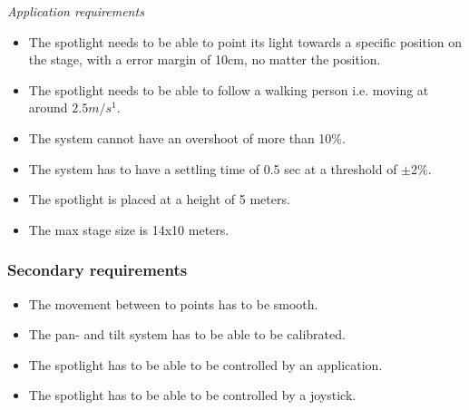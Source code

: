 \textit{Application requirements}

\begin{itemize}
\item The spotlight needs to be able to point its light towards a specific position on the stage, with a error margin of 10cm, no matter the position.

\item The spotlight needs to be able to follow a walking person i.e. moving at around $2.5 m/s^{1}$.

\item The system cannot have an overshoot of more than 10\%.

\item The system has to have a settling time of 0.5 sec at a threshold of $\pm$2\%.

\item The spotlight is placed at a height of 5 meters.

\item The max stage size is 14x10 meters.
\end{itemize}


\subsubsection{Secondary requirements}

\begin{itemize}
\item The movement between to points has to be smooth.

\item The pan- and tilt system has to be able to be calibrated.

\item The spotlight has to be able to be controlled by an application.

\item The spotlight has to be able to be controlled by a joystick.
\end{itemize}
